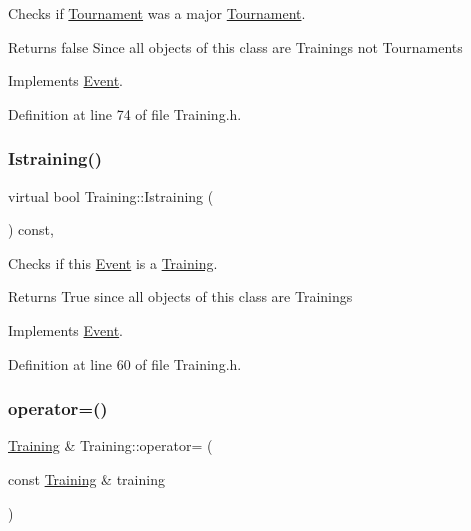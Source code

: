 Checks if \hyperlink{class_tournament}{Tournament} was a major \hyperlink{class_tournament}{Tournament}. 

\begin{DoxyReturn}{Returns}
false Since all objects of this class are Trainings not Tournaments 
\end{DoxyReturn}


Implements \hyperlink{class_event_ad1a1a9cb471d664a2ca99effc102259b}{Event}.



Definition at line 74 of file Training.\+h.

\hypertarget{class_training_ab70fe087f382d0de9dca69ce519be91e}{}\label{class_training_ab70fe087f382d0de9dca69ce519be91e} 
\subsubsection{\texorpdfstring{Istraining()}{Istraining()}}
{\footnotesize\ttfamily virtual bool Training\+::\+Istraining (\begin{DoxyParamCaption}{ }\end{DoxyParamCaption}) const\hspace{0.3cm}{\ttfamily [inline]}, {\ttfamily [virtual]}}



Checks if this \hyperlink{class_event}{Event} is a \hyperlink{class_training}{Training}. 

\begin{DoxyReturn}{Returns}
True since all objects of this class are Trainings 
\end{DoxyReturn}


Implements \hyperlink{class_event_a08af9b350f32520dca26d552d6f415b2}{Event}.



Definition at line 60 of file Training.\+h.

\hypertarget{class_training_aea6dff02f1a10d73ec15ceb310fb7b3f}{}\label{class_training_aea6dff02f1a10d73ec15ceb310fb7b3f} 
\subsubsection{\texorpdfstring{operator=()}{operator=()}}
{\footnotesize\ttfamily \hyperlink{class_training}{Training} \& Training\+::operator= (\begin{DoxyParamCaption}\item[{const \hyperlink{class_training}{Training} \&}]{training }\end{DoxyParamCaption})}



